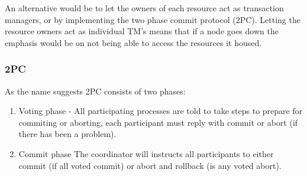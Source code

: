 \documentclass[a4paper,12pt]{article}
\begin{document}
An alternative would be to let the owners of each resource act as transaction managers, or by implementing the two phase commit protocol (2PC).
Letting the resource owners act as individual TM's means that if a node goes down the emphasis would be on not being able to access the resources it housed.

\subsubsection*{2PC}
As the name suggests 2PC consists of two phases:
\begin{enumerate}
    \item{Voting phase - All participating processes are told to take steps to prepare for commiting or aborting, each participant must reply with commit or abort (if there has been a problem).}
    \item{Commit phase  The coordinator will instructs all participants to either commit (if all voted commit) or abort and rollback (is any voted abort).}
\end{enumerate}






\vskip 0.2in
\newpage


\end{document}

